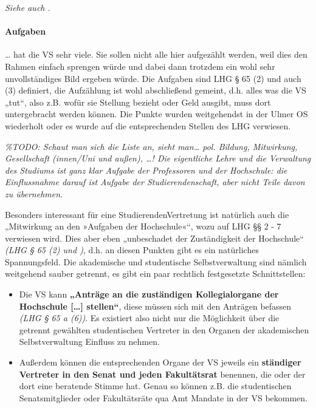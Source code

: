 \documentclass[
10pt,
a4paper,
twoside,								%
titlepage=false,							%
draft=false								%
]{scrartcl}
\begin{document}
\emph{Siehe auch .}



\paragraph{Aufgaben}\label{Glossar: Aufgaben}

… hat die VS sehr viele. Sie sollen nicht alle hier aufgezählt werden, weil dies den Rahmen einfach sprengen würde und dabei dann trotzdem ein wohl sehr unvollständiges Bild ergeben würde. Die Aufgaben sind LHG § 65 (2) und auch (3) definiert, die Aufzählung ist wohl abschließend gemeint, d.h. alles was die VS „tut“, also z.B. wofür sie Stellung bezieht oder Geld ausgibt, muss dort untergebracht werden können. Die Punkte wurden weitgehendst in der Ulmer OS wiederholt oder es wurde auf die entsprechenden Stellen des LHG verwiesen.

\textit{\%TODO: Schaut man sich die Liste an, sieht man… pol. Bildung, Mitwirkung, Gesellschaft (innen/Uni und außen), …! Die eigentliche Lehre und die Verwaltung des Studiums ist ganz klar Aufgabe der Professoren und der Hochschule: die Einflussnahme darauf ist Aufgabe der Studierendenschaft, aber nicht Teile davon zu übernehmen.}

Besonders interessant für eine StudierendenVertretung ist natürlich auch die „Mitwirkung an den »Aufgaben der Hochschule«“, wozu auf LHG §§ 2 - 7 verwiesen wird. Dies aber eben „unbeschadet der Zuständigkeit der Hochschule“ \textit{(LHG § 65 (2) und \emph{})}, d.h. an diesen Punkten gibt es ein natürliches Spannungsfeld. Die akademische und studentische Selbstverwaltung sind nämlich weitgehend sauber getrennt, es gibt ein paar rechtlich festgesetzte Schnittstellen:
\begin{itemize}
	\item Die VS kann\textbf{ „Anträge an die zuständigen Kollegialorgane der Hochschule […] stellen“}, diese müssen sich mit den Anträgen befassen \textit{(LHG § 65 a (6))}. Es existiert also nicht nur die Möglichkeit über die getrennt gewählten studentischen Vertreter in den Organen der akademischen Selbstverwaltung Einfluss zu nehmen.
	\item Außerdem können die entsprechenden Organe der VS jeweils ein \textbf{ständiger Vertreter in den Senat und jeden Fakultätsrat} benennen, die oder der dort eine beratende Stimme hat. Genau so können z.B. die studentischen Senatsmitglieder oder Fakultätsräte qua Amt Mandate in der VS bekommen.
\end{itemize}
\end{document}
